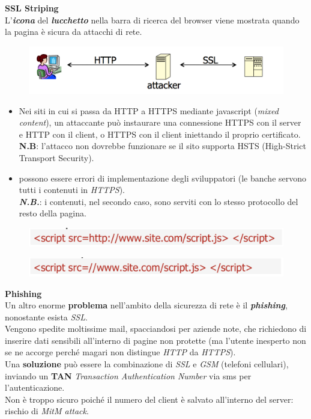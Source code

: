 \documentclass[11pt, a4paper, twoside, italian]{report}
\theoremstyle{plain}
\begin{document}
\noindent
\textbf{SSL Striping}\\
L'\textit{\textbf{icona}} del \textit{\textbf{lucchetto}} nella barra di ricerca del browser viene mostrata quando la pagina è sicura da attacchi di rete.
\begin{figure}[H]
	\centering
	\includegraphics[scale=0.7]{sslstriping}
\end{figure}
\begin{itemize}
	\item Nei siti in cui si passa da HTTP a HTTPS mediante javascript (\textit{mixed content}), un attaccante può instaurare una connessione HTTPS con il server e HTTP con il client, o HTTPS con il client iniettando il proprio certificato.\\ \textbf{N.B}: l'attacco non dovrebbe funzionare se il sito supporta HSTS (High-Strict Transport Security).
	\item  possono essere errori di implementazione degli sviluppatori (le banche servono tutti i contenuti in \textit{HTTPS}).\\
	\textbf{\textit{N.B.}}: i contenuti, nel secondo caso, sono serviti con lo stesso protocollo del resto della pagina.
\end{itemize}
\begin{multicols}{2}
\begin{figure}[H]
	\centering
	\includegraphics[scale=0.5]{scr1}
\end{figure}
\columnbreak
\begin{figure}[H]
	\centering
	\includegraphics[scale=0.5]{scr2}
\end{figure}
\end{multicols}

\noindent
\textbf{Phishing}\\
Un altro enorme \textbf{problema} nell'ambito della sicurezza di rete è il \textbf{\textit{phishing}}, nonostante esista \textit{SSL}.\\
Vengono spedite moltissime mail, spacciandosi per aziende note, che richiedono di inserire dati sensibili all'interno di pagine non protette (ma l'utente inesperto non se ne accorge perché magari non distingue \textit{HTTP} da \textit{HTTPS}).\\
Una \textbf{soluzione} può essere la combinazione di \textit{SSL} e \textit{GSM} (telefoni cellulari), inviando un \textbf{TAN} \textit{Transaction Authentication Number} via sms per l'autenticazione.\\
Non è troppo sicuro poiché il numero del client è salvato all'interno del server: rischio di \textit{MitM attack}.
\end{document}
